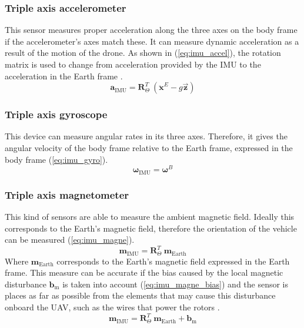 \documentclass[journal]{IEEEtran}
\newcommand*{\subb}[1]{_{\mathrm{#1}}}
\begin{document}
		\subsubsection{Triple axis accelerometer} This sensor measures proper acceleration along the three axes on the body frame if the accelerometer's axes match these. It can measure dynamic acceleration as a result of the motion of the drone.  As shown in (\ref{eq:imu_accel}), the rotation matrix is used to change from acceleration provided by the IMU to the acceleration in the Earth frame \cite{modelling_control_mahony}.\\
		\begin{equation} \label{eq:imu_accel}
		\bm{a}\subb{IMU}= \bm{R}^T_\Theta \ (\bm{\ddot{x}}^E - g \bm{\vec{z}})
		\end{equation}
		
		\subsubsection{Triple axis gyroscope} This device can measure angular rates in its three axes. Therefore, it  gives the angular velocity of the body frame relative to the Earth frame, expressed in the body frame (\ref{eq:imu_gyro}).\\
		\begin{equation} \label{eq:imu_gyro}
		\bm{\omega}\subb{IMU}= \bm{\omega}^B 
		\end{equation}
		
		\subsubsection{Triple axis magnetometer} This kind of sensors are able to measure the ambient magnetic field. Ideally this corresponds to the Earth's magnetic field, therefore the orientation of the vehicle can be measured (\ref{eq:imu_magne}).
		\begin{equation} \label{eq:imu_magne}
		\bm{m}\subb{IMU}= \bm{R}^T_\Theta \  \bm{m}\subb{Earth}
		\end{equation}
		Where $\bm{m}\subb{Earth}$ corresponds to the Earth's magnetic field expressed in the Earth frame. This measure can be accurate if the bias caused by the local magnetic disturbance $\bm{b}\subb{m}$ is taken into account (\ref{eq:imu_magne_bias}) and the sensor is places as far as possible from the elements that may cause this disturbance onboard the UAV, such as the wires that power the rotors \cite{modelling_control_mahony}.
		\begin{equation} \label{eq:imu_magne_bias}
		\bm{m}\subb{IMU}= \bm{R}^T_\Theta \  \bm{m}\subb{Earth} + \bm{b}\subb{m}
		\end{equation}
		
\end{document}
